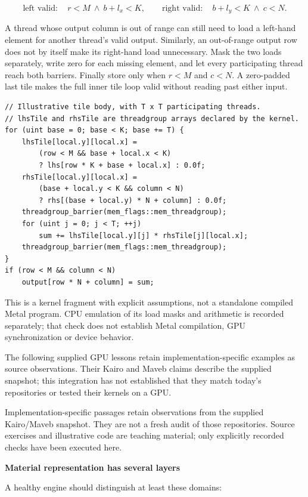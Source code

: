 \[
\text{left valid}:\quad r<M\ \land\ b+l_x<K,
\qquad
\text{right valid}:\quad b+l_y<K\ \land\ c<N.
\]

A thread whose output column is out of range can still need to load a left-hand element for another thread's valid output. Similarly, an out-of-range output row does not by itself make its right-hand load unnecessary. Mask the two loads separately, write zero for each missing element, and let every participating thread reach both barriers. Finally store only when \(r<M\) and \(c<N\). A zero-padded last tile makes the full inner tile loop valid without reading past either input.

\begin{verbatim}
// Illustrative tile body, with T x T participating threads.
// lhsTile and rhsTile are threadgroup arrays declared by the kernel.
for (uint base = 0; base < K; base += T) {
    lhsTile[local.y][local.x] =
        (row < M && base + local.x < K)
        ? lhs[row * K + base + local.x] : 0.0f;
    rhsTile[local.y][local.x] =
        (base + local.y < K && column < N)
        ? rhs[(base + local.y) * N + column] : 0.0f;
    threadgroup_barrier(mem_flags::mem_threadgroup);
    for (uint j = 0; j < T; ++j)
        sum += lhsTile[local.y][j] * rhsTile[j][local.x];
    threadgroup_barrier(mem_flags::mem_threadgroup);
}
if (row < M && column < N)
    output[row * N + column] = sum;
\end{verbatim}

This is a kernel fragment with explicit assumptions, not a standalone compiled Metal program. CPU emulation of its load masks and arithmetic is recorded separately; that check does not establish Metal compilation, GPU synchronization or device behavior.

The following supplied GPU lessons retain implementation-specific examples as source observations. Their Kairo and Maveb claims describe the supplied snapshot; this integration has not established that they match today's repositories or tested their kernels on a GPU.

Implementation-specific passages retain observations from the supplied Kairo/Maveb snapshot. They are not a fresh audit of those repositories. Source exercises and illustrative code are teaching material; only explicitly recorded checks have been executed here.

\textbf{Material representation has several layers}

A healthy engine should distinguish at least these domains:

